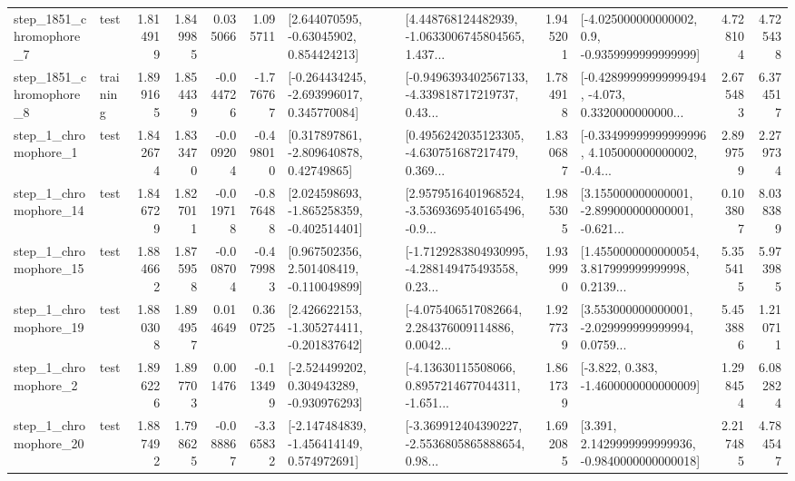 \begin{tabular}{llrrrrllrlrr}
  step\_1851\_chromophore\_7 &      test &      1.814919 &    1.849985 &      0.035066 &  1.095711 &     [2.644070595, -0.63045902, 0.854424213] &  [4.448768124482939, -1.0633006745804565, 1.437... &       1.945201 &     [-4.025000000000002, 0.9, -0.9359999999999999] &            4.728104 &          4.725438 \\
  step\_1851\_chromophore\_8 &  training &      1.899165 &    1.854439 &     -0.044726 & -1.776767 &   [-0.264434245, -2.693996017, 0.345770084] &  [-0.9496393402567133, -4.339818717219737, 0.43... &       1.784918 &  [-0.42899999999999494, -4.073, 0.3320000000000... &            2.675483 &          6.374517 \\
     step\_1\_chromophore\_1 &      test &      1.842674 &    1.833470 &     -0.009204 & -0.498010 &     [0.317897861, -2.809640878, 0.42749865] &  [0.4956242035123305, -4.630751687217479, 0.369... &       1.830687 &  [-0.33499999999999996, 4.105000000000002, -0.4... &            2.899759 &          2.279734 \\
    step\_1\_chromophore\_14 &      test &      1.846729 &    1.827011 &     -0.019718 & -0.876488 &   [2.024598693, -1.865258359, -0.402514401] &  [2.9579516401968524, -3.5369369540165496, -0.9... &       1.985305 &  [3.155000000000001, -2.899000000000001, -0.621... &            0.103807 &          8.038389 \\
    step\_1\_chromophore\_15 &      test &      1.884662 &    1.875958 &     -0.008704 & -0.479983 &    [0.967502356, 2.501408419, -0.110049899] &  [-1.7129283804930995, -4.288149475493558, 0.23... &       1.939990 &  [1.4550000000000054, 3.817999999999998, 0.2139... &            5.355415 &          5.973985 \\
    step\_1\_chromophore\_19 &      test &      1.880308 &    1.894957 &      0.014649 &  0.360725 &   [2.426622153, -1.305274411, -0.201837642] &  [-4.075406517082664, 2.284376009114886, 0.0042... &       1.927739 &  [3.553000000000001, -2.029999999999994, 0.0759... &            5.453886 &          1.210711 \\
     step\_1\_chromophore\_2 &      test &      1.896226 &    1.897703 &      0.001476 & -0.113499 &   [-2.524499202, 0.304943289, -0.930976293] &  [-4.13630115508066, 0.8957214677044311, -1.651... &       1.861739 &               [-3.822, 0.383, -1.4600000000000009] &            1.298454 &          6.082824 \\
    step\_1\_chromophore\_20 &      test &      1.887492 &    1.798625 &     -0.088867 & -3.365832 &   [-2.147484839, -1.456414149, 0.574972691] &  [-3.369912404390227, -2.5536805865888654, 0.98... &       1.692085 &   [3.391, 2.1429999999999936, -0.9840000000000018] &            2.217485 &          4.784547 \\

\end{tabular}
